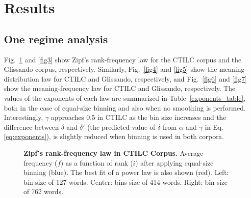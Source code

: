 \documentclass[10pt,letterpaper]{article}
\newif\ifarxiv
\begin{document}
\section*{Results}
\label{S:3}

\subsection*{One regime analysis}

Fig.~\ref{fig2} and \ref{fig3} show Zipf's rank-frequency law for the CTILC corpus and the Glissando corpus, respectively. Similarly, Fig.~\ref{fig4} and \ref{fig5} show the meaning distribution law for CTILC and Glissando, respectively, and Fig.~\ref{fig6} and \ref{fig7} show the meaning-frequency law for CTILC and Glissando, respectively. The values of the exponents of each law are summarized in Table~\ref{exponents_table}, both in the case of equal-size binning and also when no smoothing is performed. 
Interestingly, $\gamma$ approaches $0.5$ in CTILC as the bin size increases and the difference between 
$\delta$ and $\delta'$ (the predicted value of $\delta$ from $\alpha$ and $\gamma$ in Eq. \ref{eq:exponents}), is slightly reduced when binning is used in both corpora.

\begin{figure}[!h]
\ifarxiv
\begin{minipage}{0.32\textwidth}
\centering
\texttt{[image: DIEC2\_CTILC\_senseCG\_zipf\_grup\_1\_one\_plot\_nou\_LS.png]}
\end{minipage}
\hspace*{\fill}
\begin{minipage}{0.32\textwidth}
\centering
\texttt{[image: DIEC2\_CTILC\_senseCG\_zipf\_grup\_5\_one\_plot\_nou\_LS.png]}
\end{minipage}
\hspace*{\fill}
\begin{minipage}{0.32\textwidth}
\centering
\texttt{[image: DIEC2\_CTILC\_senseCG\_zipf\_grup\_10\_one\_plot\_nou\_LS.png]}
\end{minipage}
\fi
\caption{\textbf{Zipf's rank-frequency law in CTILC Corpus.} Average frequency ($f$) as a function of rank ($i$) after applying equal-size binning (blue). The best fit of a power law is also shown (red). Left: bin size of 127 words. Center: bins size of 414 words. Right: bin size of 762 words.}
\label{fig2}
\end{figure}
\end{document}
